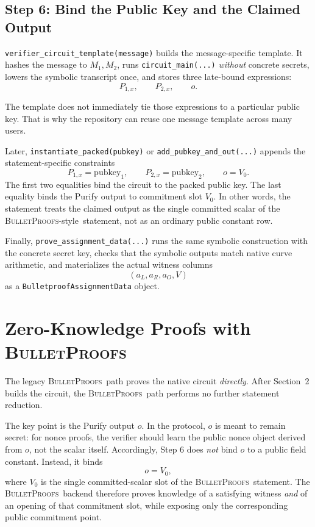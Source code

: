 \documentclass[11pt]{article}
\DeclareRobustCommand{\bp}{{\normalfont\scshape BulletProofs}}
\begin{document}
\subsection{Step 6: Bind the Public Key and the Claimed Output}

\texttt{verifier\_circuit\_template(message)} builds the message-specific template. It hashes
the message to $M_1,M_2$, runs \texttt{circuit\_main(...)} \emph{without} concrete secrets, lowers
the symbolic transcript once, and stores three late-bound expressions:
\[
P_{1,x}, \qquad P_{2,x}, \qquad o.
\]

The template does not immediately tie those expressions to a particular public key. That is why the repository
can reuse one message template across many users.

Later, \texttt{instantiate\_packed(pubkey)} or \texttt{add\_pubkey\_and\_out(...)} appends the
statement-specific constraints
\[
P_{1,x} = \text{pubkey}_1, \qquad
P_{2,x} = \text{pubkey}_2, \qquad
o = V_0.
\]
The first two equalities bind the circuit to the packed public key. The last equality binds the
Purify output to commitment slot $V_0$. In other words, the statement treats the claimed output as the
single committed scalar of the \bp-style\ statement, not as an ordinary public constant row.

Finally, \texttt{prove\_assignment\_data(...)} runs the same symbolic construction with the concrete
secret key, checks that the symbolic outputs match native curve arithmetic, and materializes the
actual witness columns
\[
(a_L, a_R, a_O, V)
\]
as a \texttt{BulletproofAssignmentData} object.

\section{Zero-Knowledge Proofs with \bp}

The legacy \bp\ path proves the native circuit \emph{directly}. After Section~2 builds the circuit,
the \bp\ path performs no further statement reduction.

The key point is the Purify output $o$. In the protocol, $o$ is meant to remain secret:
for nonce proofs, the verifier should learn the public nonce object derived from $o$, not the
scalar itself. Accordingly, Step 6 does \emph{not} bind $o$ to a public field constant. Instead, it binds
\[
o = V_0,
\]
where $V_0$ is the single committed-scalar slot of the \bp\ statement. The \bp\ backend therefore
proves knowledge of a satisfying witness \emph{and} of an opening of that commitment slot, while
exposing only the corresponding public commitment point.
\end{document}
